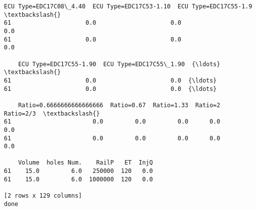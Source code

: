\documentclass[11pt]{article}
\begin{document}
\begin{Verbatim}[commandchars=\\\{\}]
    ECU Type=EDC17C08\_4.40  ECU Type=EDC17C53-1.10  ECU Type=EDC17C55-1.9  \textbackslash{}
61                     0.0                     0.0                    0.0   
61                     0.0                     0.0                    0.0   

    ECU Type=EDC17C55-1.90  ECU Type=EDC17C55\_1.90  {\ldots}   \textbackslash{}
61                     0.0                     0.0  {\ldots}    
61                     0.0                     0.0  {\ldots}    

    Ratio=0.6666666666666666  Ratio=0.67  Ratio=1.33  Ratio=2  Ratio=2/3  \textbackslash{}
61                       0.0         0.0         0.0      0.0        0.0   
61                       0.0         0.0         0.0      0.0        0.0   

    Volume  holes Num.    RailP   ET  InjQ  
61    15.0         6.0   250000  120   0.0  
61    15.0         6.0  1000000  120   0.0  

[2 rows x 129 columns]
done

    \end{Verbatim}
\end{document}
